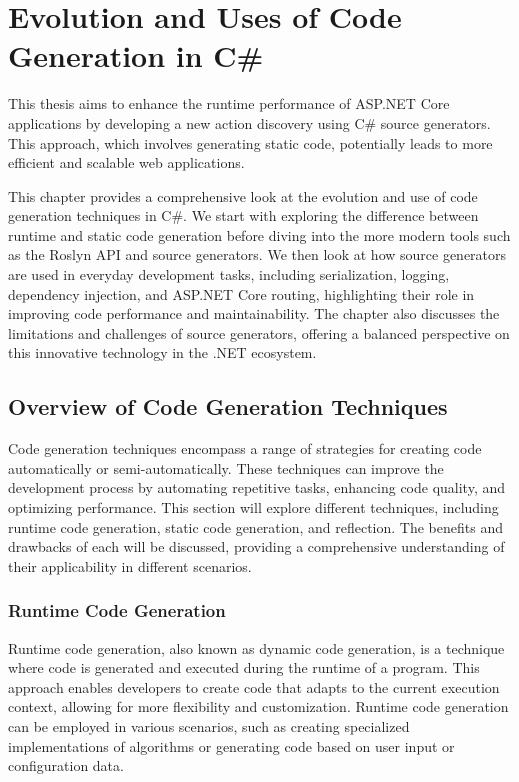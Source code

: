 \chapter{Evolution and Uses of Code Generation in C\#}

This thesis aims to enhance the runtime performance of ASP.NET Core applications by developing a new action discovery using C\# source generators. This approach, which involves generating static code, potentially leads to more efficient and scalable web applications.

This chapter provides a comprehensive look at the evolution and use of code generation techniques in C\#. We start with exploring the difference between runtime and static code generation before diving into the more modern tools such as the Roslyn API and source generators. We then look at how source generators are used in everyday development tasks, including serialization, logging, dependency injection, and ASP.NET Core routing, highlighting their role in improving code performance and maintainability. The chapter also discusses the limitations and challenges of source generators, offering a balanced perspective on this innovative technology in the .NET ecosystem.

\section{Overview of Code Generation Techniques}

Code generation techniques encompass a range of strategies for creating code automatically or semi-automatically. These techniques can improve the development process by automating repetitive tasks, enhancing code quality, and optimizing performance. This section will explore different techniques, including runtime code generation, static code generation, and reflection. The benefits and drawbacks of each will be discussed, providing a comprehensive understanding of their applicability in different scenarios.

\subsection{Runtime Code Generation}

Runtime code generation, also known as dynamic code generation, is a technique where code is generated and executed during the runtime of a program. This approach enables developers to create code that adapts to the current execution context, allowing for more flexibility and customization. Runtime code generation can be employed in various scenarios, such as creating specialized implementations of algorithms or generating code based on user input or configuration data\cite{Chiba1995, Aycock2003}.

